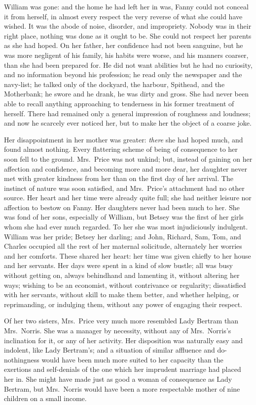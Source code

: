 \documentclass{article}
\begin{document}
William was gone:  and the home he had left her in was,
Fanny could not conceal it from herself, in almost every
respect the very reverse of what she could have wished.
It was the abode of noise, disorder, and impropriety.
Nobody was in their right place, nothing was done as it ought
to be.  She could not respect her parents as she had hoped.
On her father, her confidence had not been sanguine, but he
was more negligent of his family, his habits were worse,
and his manners coarser, than she had been prepared for.
He did not want abilities but he had no curiosity,
and no information beyond his profession; he read only
the newspaper and the navy-list; he talked only of
the dockyard, the harbour, Spithead, and the Motherbank;
he swore and he drank, he was dirty and gross.
She had never been able to recall anything approaching
to tenderness in his former treatment of herself.
There had remained only a general impression of roughness
and loudness; and now he scarcely ever noticed her,
but to make her the object of a coarse joke.

Her disappointment in her mother was greater:
\emph{there} she had hoped much, and found almost nothing.
Every flattering scheme of being of consequence to her
soon fell to the ground.  Mrs.\ Price was not unkind;
but, instead of gaining on her affection and confidence,
and becoming more and more dear, her daughter never met
with greater kindness from her than on the first day of
her arrival.  The instinct of nature was soon satisfied,
and Mrs.\ Price's attachment had no other source.
Her heart and her time were already quite full;
she had neither leisure nor affection to bestow on Fanny.
Her daughters never had been much to her.  She was fond
of her sons, especially of William, but Betsey was the first
of her girls whom she had ever much regarded.  To her she
was most injudiciously indulgent.  William was her pride;
Betsey her darling; and John, Richard, Sam, Tom, and Charles
occupied all the rest of her maternal solicitude, alternately
her worries and her comforts.  These shared her heart:
her time was given chiefly to her house and her servants.
Her days were spent in a kind of slow bustle; all was busy
without getting on, always behindhand and lamenting it,
without altering her ways; wishing to be an economist,
without contrivance or regularity; dissatisfied with
her servants, without skill to make them better,
and whether helping, or reprimanding, or indulging them,
without any power of engaging their respect.

Of her two sisters, Mrs.\ Price very much more resembled Lady
Bertram than Mrs.\ Norris.  She was a manager by necessity,
without any of Mrs.\ Norris's inclination for it, or any
of her activity.  Her disposition was naturally easy
and indolent, like Lady Bertram's; and a situation of similar
affluence and do-nothingness would have been much more
suited to her capacity than the exertions and self-denials
of the one which her imprudent marriage had placed her in.
She might have made just as good a woman of consequence
as Lady Bertram, but Mrs.\ Norris would have been a more
respectable mother of nine children on a small income.
\end{document}
